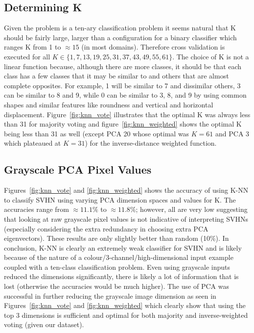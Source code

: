 \documentclass{article} %
\begin{document}
\subsection{Determining K} \label{knn_k}
Given the problem is a ten-ary classification problem it seems natural that K should be fairly large, larger than a configuration for a binary classifier which ranges K from 1 to $\approx 15$ (in most domains).  Therefore cross validation is executed for all $K \in \{1, 7, 13, 19, 25, 31, 37, 43, 49, 55, 61\}$.  The choice of K is not a linear function because, although there are more classes, it should be that each class has a few classes that it may be similar to and others that are almost complete opposites.  For example, 1 will be similar to 7 and dissimilar others, 3 can be similar to 8 and 9, while 0 can be similar to 3, 8, and 9 by using common shapes and similar features like roundness and vertical and horizontal displacement.  Figure~\ref{fig:knn_vote} illustrates that the optimal K was always less than 31 for majority voting and figure~\ref{fig:knn_weighted} shows the optimal K being less than 31 as well (except PCA 20 whose optimal was $K=61$ and PCA 3 which plateaued at $K=31$) for the inverse-distance weighted function.

\subsection{Grayscale PCA Pixel Values}
Figures~\ref{fig:knn_vote} and \ref{fig:knn_weighted} shows the accuracy of using K-NN to classify SVHN using varying PCA dimension spaces and values for K. The accuracies range from $\approx 11.1\%$ to $\approx 11.8\%$; however, all are very low suggesting that looking at raw grayscale pixel values is not indicative of interpreting SVHNs (especially considering the extra redundancy in choosing extra PCA eigenvectors).  These results are only slightly better than random (10\%).  In conclusion, K-NN is clearly an extremely weak classifier for SVHN and is likely because of the nature of a colour/3-channel/high-dimensional input example coupled with a ten-class classification problem.  Even using grayscale inputs reduced the dimensions significantly, there is likely a lot of information that is lost (otherwise the accuracies would be much higher).  The use of PCA was successful in further reducing the grayscale image dimension as seen in Figures~\ref{fig:knn_vote} and \ref{fig:knn_weighted} which clearly show that using the top 3 dimensions is sufficient and optimal for both majority and inverse-weighted voting (given our dataset).
\end{document}
